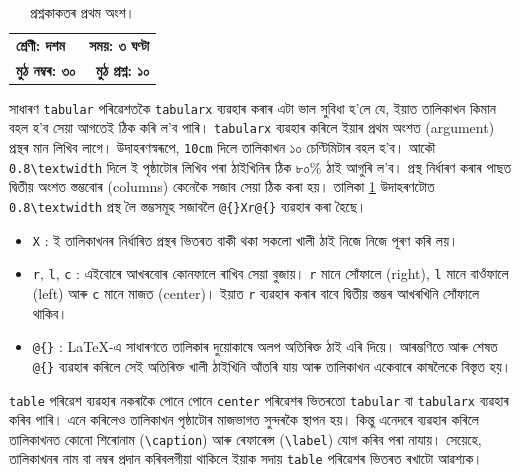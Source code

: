 \documentclass[12pt,a4paper]{article} %
\begin{document}
	\begin{table}[htbp]
		\centering
		\begin{tabularx}{0.8\textwidth}{@{}Xr@{}}
			\textbf{শ্ৰেণী: দশম} & \textbf{সময়: ৩ ঘণ্টা} \\[2pt]
			\textbf{মুঠ নম্বৰ: ৩০} & \textbf{মুঠ প্ৰশ্ন: ১০}
		\end{tabularx}
		\caption{প্ৰশ্নকাকতৰ প্ৰথম অংশ।}
		\label{tab:tabularex}
	\end{table}
	
	সাধাৰণ \texttt{tabular} পৰিৱেশতকৈ \texttt{tabularx} ব্যৱহাৰ কৰাৰ এটা ভাল সুবিধা হ'লে যে, ইয়াত তালিকাখন কিমান বহল হ'ব সেয়া আগতেই ঠিক কৰি ল'ব পাৰি। \texttt{tabularx} ব্যৱহাৰ কৰিলে ইয়াৰ প্ৰথম অংশত (argument) প্ৰস্থৰ মান লিখিব লাগে। উদাহৰণস্বৰূপে, \texttt{10cm} দিলে তালিকাখন ১০ চেণ্টিমিটাৰ বহল হ'ব। আকৌ \texttt{0.8\textbackslash textwidth} দিলে ই পৃষ্ঠাটোৰ লিখিব পৰা ঠাইখিনিৰ ঠিক ৮০\% ঠাই আগুৰি ল'ব। প্ৰস্থ নিৰ্ধাৰণ কৰাৰ পাছত দ্বিতীয় অংশত স্তম্ভবোৰ (columns) কেনেকৈ সজাব সেয়া ঠিক কৰা হয়। তালিকা \ref{tab:tabularex} উদাহৰণটোত \texttt{0.8\textbackslash textwidth} প্ৰস্থ লৈ স্তম্ভসমূহ সজাবলৈ \texttt{@\{\}Xr@\{\}} ব্যৱহাৰ কৰা হৈছে। 
	
	\begin{itemize}[noitemsep]
		\item \texttt{X} : ই তালিকাখনৰ নিৰ্ধাৰিত প্ৰস্থৰ ভিতৰত বাকী থকা সকলো খালী ঠাই নিজে নিজে পূৰণ কৰি লয়।
		\item \texttt{r}, \texttt{l}, \texttt{c} : এইবোৰে আখৰবোৰ কোনফালে ৰাখিব সেয়া বুজায়। \texttt{r} মানে সোঁফালে (right), \texttt{l} মানে বাওঁফালে (left) আৰু \texttt{c} মানে মাজত (center)। ইয়াত \texttt{r} ব্যৱহাৰ কৰাৰ বাবে দ্বিতীয় স্তম্ভৰ আখৰখিনি সোঁফালে থাকিব।
		\item \texttt{@\{\}} : \LaTeX{}-এ সাধাৰণতে তালিকাৰ দুয়োকাষে অলপ অতিৰিক্ত ঠাই এৰি দিয়ে। আৰম্ভণিতে আৰু শেষত \texttt{@\{\}} ব্যৱহাৰ কৰিলে সেই অতিৰিক্ত খালী ঠাইখিনি আঁতৰি যায় আৰু তালিকাখন একেবাৰে কাষলৈকে বিস্তৃত হয়।
	\end{itemize}
	
	\texttt{table} পৰিৱেশ ব্যৱহাৰ নকৰাকৈ পোনে পোনে \texttt{center} পৰিৱেশৰ ভিতৰতো \texttt{tabular} বা \texttt{tabularx} ব্যৱহাৰ কৰিব পাৰি। এনে কৰিলেও তালিকাখন পৃষ্ঠাটোৰ মাজভাগত সুন্দৰকৈ স্থাপন হয়। কিন্তু এনেদৰে ব্যৱহাৰ কৰিলে তালিকাখনত কোনো শিৰোনাম (\texttt{\textbackslash caption}) আৰু ৰেফাৰেন্স (\texttt{\textbackslash label}) যোগ কৰিব পৰা নাযায়। সেয়েহে, তালিকাখনৰ নাম বা নম্বৰ প্ৰদান কৰিবলগীয়া থাকিলে ইয়াক সদায় \texttt{table} পৰিৱেশৰ ভিতৰত ৰখাটো আৱশ্যক।
	
\end{document}

